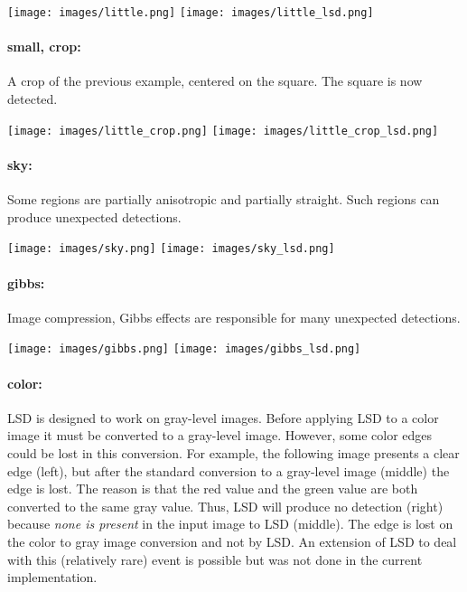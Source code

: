 \documentclass{ipol}
\begin{document}
\begin{center}
\texttt{[image: images/little.png]}
\texttt{[image: images/little\_lsd.png]}
\end{center}

\paragraph{small, crop:} A crop of the previous example, centered on
the square. The square is now detected.

\begin{center}
\texttt{[image: images/little\_crop.png]}
\texttt{[image: images/little\_crop\_lsd.png]}
\end{center}

\paragraph{sky:} Some regions are partially anisotropic and partially
straight. Such regions can produce unexpected detections.

\begin{center}
\texttt{[image: images/sky.png]}
\texttt{[image: images/sky\_lsd.png]}
\end{center}

\paragraph{gibbs:} Image compression, Gibbs effects are responsible
for many unexpected detections.

\begin{center}
\texttt{[image: images/gibbs.png]}
\texttt{[image: images/gibbs\_lsd.png]}
\end{center}

\paragraph{color:} LSD is designed to work on gray-level images.
Before applying LSD to a color image it must be converted to a
gray-level image. However, some color edges could be lost in this
conversion.  For example, the following image presents a clear edge
(left), but after the standard conversion to a gray-level image
(middle) the edge is lost. The reason is that the red value and the
green value are both converted to the same gray value. Thus, LSD will
produce no detection (right) because \emph{none is present} in the
input image to LSD (middle). The edge is lost on the color to gray
image conversion and not by LSD. An extension of LSD to deal with this
(relatively rare) event is possible but was not done in the current
implementation.
\end{document}
